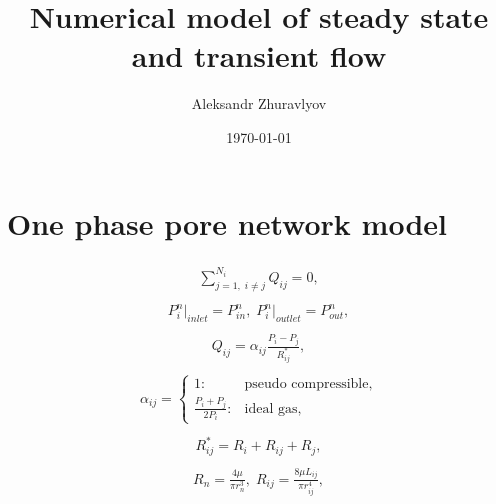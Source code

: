\documentclass[a4paper,12pt]{extreport}
\author{Aleksandr Zhuravlyov}
\title{Numerical model of steady state and transient flow}
\date{\today}
\begin{document}
    \pagecolor{pageColor}
    \color{fontColor}

    \section*{One phase pore network model}

    \begin{eqnarray}
        \begin{gathered}
            \sum^{N_{i}}_{j=1, \; i\neq j} Q_{ij} = 0,
        \end{gathered}
    \end{eqnarray}
    \begin{eqnarray}
        \begin{gathered}
            P^{n}_{i}\Big|_{inlet} = P^{n}_{in}, \;
            P^{n}_{i}\Big|_{outlet} = P^{n}_{out},
        \end{gathered}
    \end{eqnarray}
    \begin{eqnarray}
        \begin{gathered}
            Q_{ij} = \alpha_{ij} \frac{P_{i} - P_{j}}{R^*_{ij}},
        \end{gathered}
    \end{eqnarray}
    \begin{eqnarray}
        \begin{gathered}
            \alpha_{ij} =\begin{cases}
                             1: &\text{pseudo compressible},\\
                             \frac{P_i + P_j}{2P_i}: &\text{ideal gas},
            \end{cases}
        \end{gathered}
    \end{eqnarray}
    \begin{eqnarray}
        \begin{gathered}
            R^*_{ij} = R_{i} + R_{ij} + R_{j},
        \end{gathered}
    \end{eqnarray}
    \begin{eqnarray}
        \begin{gathered}
            R_{n} =\frac{4 \mu}{\pi r_{n}^{3}}, \; R_{ij} =\frac{8 \mu L_{ij}}{\pi r_{ij}^{4}},
        \end{gathered}
    \end{eqnarray}
\end{document}
